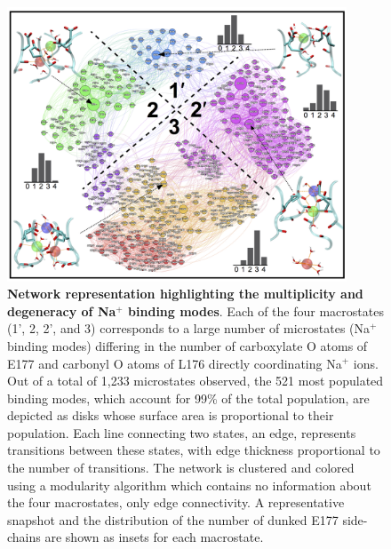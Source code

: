 \begin{refsection}
\begin{figure}[hp]
\centering
\includegraphics[width=0.9\textwidth]{nav1/Nav1FigS7}
\caption[Network representation highlighting the multiplicity and degeneracy of Na$^+$ binding modes]{\textbf{Network representation highlighting the multiplicity and degeneracy of Na$^+$ binding modes}. Each of the four macrostates (1', 2, 2', and 3) corresponds to a large number of microstates (Na$^+$ binding modes) differing in the number of carboxylate O atoms of E177 and carbonyl O atoms of L176 directly coordinating Na$^+$ ions.  Out of a total of 1,233 microstates observed, the 521 most populated binding modes, which account for 99\% of the total population, are depicted as disks whose surface area is proportional to their population.  Each line connecting two states, an edge, represents transitions between these states, with edge thickness proportional to the number of transitions.  The network is clustered and colored using a modularity algorithm which contains no information about the four macrostates, only edge connectivity.  A representative snapshot and the distribution of the number of dunked E177 side-chains are shown as insets for each macrostate.}
\label{fig:nav1fig5}
\end{figure}


\end{refsection}
